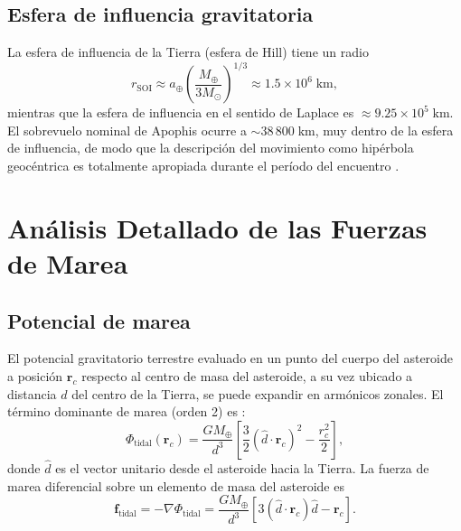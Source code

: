 \documentclass[a4paper]{article}
\begin{document}
\subsection{Esfera de influencia gravitatoria}

La esfera de influencia de la Tierra (esfera de Hill) tiene un radio
\begin{equation}
  r_\text{SOI} \approx a_\oplus \left(\frac{M_\oplus}{3 M_\odot}\right)^{1/3} \approx 1.5 \times 10^6\;\text{km},
\end{equation}
mientras que la esfera de influencia en el sentido de Laplace es $\approx 9.25 \times 10^5\;\text{km}$. El sobrevuelo nominal de Apophis ocurre a $\sim 38\,800\;\text{km}$, muy dentro de la esfera de influencia, de modo que la descripción del movimiento como hipérbola geocéntrica es totalmente apropiada durante el período del encuentro \cite{murray1999solar, scheeres2023proximity}.

\section{Análisis Detallado de las Fuerzas de Marea}

\subsection{Potencial de marea}

El potencial gravitatorio terrestre evaluado en un punto del cuerpo del asteroide a posición $\mathbf{r}_c$ respecto al centro de masa del asteroide, a su vez ubicado a distancia $d$ del centro de la Tierra, se puede expandir en armónicos zonales. El término dominante de marea (orden 2) es \cite{murray1999solar}:
\begin{equation}
  \Phi_\text{tidal}(\mathbf{r}_c) = \frac{GM_\oplus}{d^3}\left[\frac{3}{2}(\hat{d}\cdot \mathbf{r}_c)^2 - \frac{r_c^2}{2}\right],
\end{equation}
donde $\hat{d}$ es el vector unitario desde el asteroide hacia la Tierra. La fuerza de marea diferencial sobre un elemento de masa del asteroide es
\begin{equation}
  \mathbf{f}_\text{tidal} = -\nabla \Phi_\text{tidal} = \frac{GM_\oplus}{d^3}\left[3(\hat{d}\cdot\mathbf{r}_c)\hat{d} - \mathbf{r}_c\right].
\end{equation}
\end{document}
